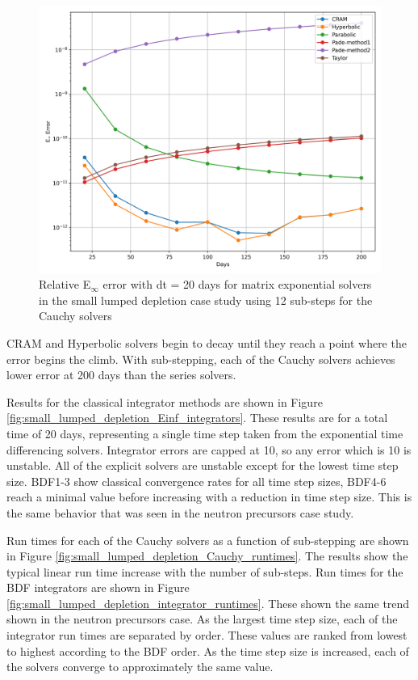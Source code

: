 \begin{figure}[p]
    \centering
    \includegraphics[width=5in]{images/chapter-5/caseStudies/smallLumpedDepletion/msrSmallLumpDepletionEinfErrorerrorSteps12.png}
    \caption{Relative E$_{\infty}$ error with dt = 20 days for matrix exponential solvers in the small lumped depletion case study using 12 sub-steps for the Cauchy solvers}
    \label{fig:small_lumped_depletion_Einf_steps12}
\end{figure}

\clearpage


\noindent CRAM and Hyperbolic solvers begin to decay until they reach a point where the error begins the climb. With sub-stepping, each of the Cauchy solvers achieves lower error at 200 days than the series solvers. 

Results for the classical integrator methods are shown in Figure \ref{fig:small_lumped_depletion_Einf_integrators}. These results are for a total time of 20 days, representing a single time step taken from the exponential time differencing solvers. Integrator errors are capped at 10, so any error which is 10 is unstable. All of the explicit solvers are unstable except for the lowest time step size. BDF1-3 show classical convergence rates for all time step sizes, BDF4-6 reach a minimal value before increasing with a reduction in time step size. This is the same behavior that was seen in the neutron precursors case study. 

Run times for each of the Cauchy solvers as a function of sub-stepping are shown in Figure \ref{fig:small_lumped_depletion_Cauchy_runtimes}. The results show the typical linear run time increase with the number of sub-steps. Run times for the BDF integrators are shown in Figure \ref{fig:small_lumped_depletion_integrator_runtimes}. These shown the same trend shown in the neutron precursors case. As the largest time step size, each of the integrator run times are separated by order. These values are ranked from lowest to highest according to the BDF order. As the time step size is increased, each of the solvers converge to approximately the same value.  

